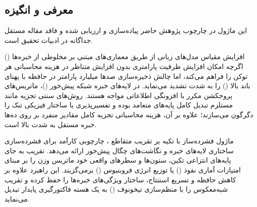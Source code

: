 \subsection{معرفی و انگیزه}
این ماژول در چارچوب پژوهش حاضر پیاده‌سازی و ارزیابی شده و فاقد مقاله مستقل جداگانه در ادبیات تحقیق است.

افزایش مقیاس مدل‌های زبانی از طریق معماری‌های مبتنی بر مخلوطی از خبره‌ها () اگرچه امکان افزایش ظرفیت پارامتری بدون افزایش متناظر در هزینه محاسباتی هر توکن را فراهم می‌کند، اما چالش ذخیره‌سازی صدها میلیارد پارامتر در حافظه با پهنای باند بالا () را به شدت تشدید می‌نماید. در لایه‌های خبره شبکه پیش‌خور ()، ماتریس‌های پروجکشن مکرر با افزونگی اطلاعاتی مواجه هستند. روش‌های سنتی تجزیه مانند  مستلزم تبدیل کامل پایه‌های متعامد بوده و تفسیرپذیری یا ساختار فیزیکی تنک را دگرگون می‌سازند؛ علاوه بر آن، هزینه محاسباتی تجزیه کامل مقادیر منفرد بر روی ده‌ها خبره مستقل به شدت بالا است.

ماژول فشرده‌ساز  با تکیه بر تقریب متقاطع ، چارچوبی کارآمد برای فشرده‌سازی ساختاری لایه‌های خبره  و نگاشت‌های چگال پیش‌خور ارائه می‌دهد. تقریب  به جای پایه‌های انتزاعی تکین، ستون‌ها و سطرهای واقعی خود ماتریس وزن را بر مبنای امتیازات آماری نفوذ () یا توزیع انرژی فروبنیوس () برمی‌گزیند. این راهبرد علاوه بر کاهش حافظه و تسریع استنتاج، ساختار ویژگی‌های خبره‌ها را حفظ کرده و تقریب شبه‌معکوس را با منظم‌سازی تیخونوف () به یک هسته فاکتورگیری پایدار تبدیل می‌نماید.
